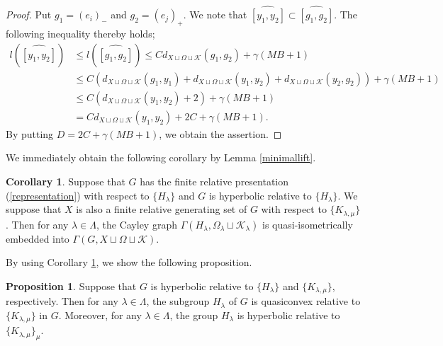 \documentclass{amsart}
\theoremstyle{definition}
\newtheorem{Cor}[Thm]{Corollary}
\newtheorem{Prop}[Thm]{Proposition}
\begin{document}
\begin{proof}
Put $g_1=(e_i)_-$ and $g_2=(e_j)_+$. 
We note that $\widehat{[y_1,y_2]} \subset \widehat{[g_1,g_2]}$. 
The following inequality thereby holds;
\begin{equation*}
\begin{split}
l(\widehat{[y_1,y_2]})
&\le l(\widehat{[g_1,g_2]}) \le Cd_{X\sqcup\Omega\sqcup{\mathcal K}}(g_1,g_2)+\gamma(MB+1)\\
&\le C\left(d_{X\sqcup\Omega\sqcup{\mathcal K}}(g_1,y_1)+d_{X\sqcup\Omega\sqcup{\mathcal K}}(y_1,y_2)+d_{X\sqcup\Omega\sqcup{\mathcal K}}(y_2,g_2)\right) +\gamma(MB+1)\\
&\le C\left(d_{X\sqcup\Omega\sqcup{\mathcal K}}(y_1,y_2)+2\right)+\gamma(MB+1)\\
&= Cd_{X\sqcup\Omega\sqcup{\mathcal K}}(y_1,y_2)+2C+\gamma(MB+1).
\end{split}
\end{equation*}
By putting $D=2C+\gamma(MB+1)$, we obtain the assertion. 
\end{proof}

We immediately obtain the following corollary by Lemma \ref{minimallift}.

\begin{Cor}\label{embgraph}
Suppose that $G$ has the finite relative presentation (\ref{representation}) with respect to $\{H_\lambda\}$ and $G$ is hyperbolic relative to $\{H_\lambda\}$. 
We suppose that $X$ is also a finite relative generating set of $G$ with respect to $\{K_{\lambda,\mu}\}$. 
Then for any $\lambda\in\Lambda$, the Cayley graph $\Gamma(H_\lambda, \Omega_\lambda\sqcup{\mathcal K}_\lambda)$ is quasi-isometrically embedded into $\Gamma(G, X\sqcup \Omega\sqcup{\mathcal K})$.
\end{Cor}

By using Corollary \ref{embgraph}, we show the following proposition. 

\begin{Prop}\label{blowup-a}
Suppose that $G$ is hyperbolic relative to $\{H_\lambda\}$ and $\{K_{\lambda,\mu}\}$, respectively. 
Then for any $\lambda\in \Lambda$, the subgroup $H_\lambda$ of $G$ is quasiconvex relative to $\{K_{\lambda,\mu}\}$ in $G$. 
Moreover, for any $\lambda\in\Lambda$, the group $H_\lambda$ is hyperbolic relative to $\{K_{\lambda,\mu}\}_\mu$. 
\end{Prop}
\end{document}
